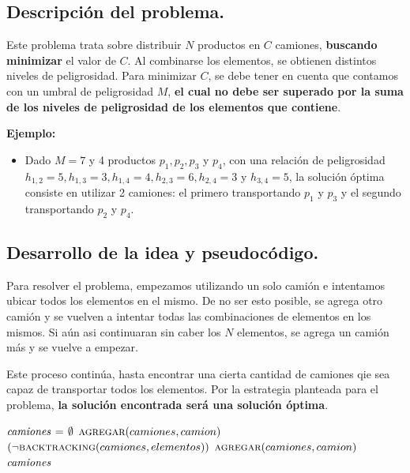 \subsection{Descripción del problema.}

\vspace*{0.3cm}

Este problema trata sobre distribuir $N$ productos en $C$ camiones, \textbf{buscando minimizar}
el valor de $C$. Al combinarse los elementos, se obtienen distintos niveles de peligrosidad.
Para minimizar $C$, se debe tener en cuenta que contamos con un umbral de peligrosidad
$M$, \textbf{el cual no debe ser superado por la suma de los niveles de peligrosidad de los
elementos que contiene}.

\vspace*{0.5cm}

\textbf{Ejemplo:}
\begin{itemize}
  \item Dado $M = 7$ y 4 productos $p_1, p_2, p_3$ y $p_4$, con una relación
  de peligrosidad $h_{1,2} = 5, h_{1,3} = 3, h_{1,4} = 4, h_{2,3} = 6, h_{2,4} =
  3$ y $h_{3,4} = 5$, la solución óptima consiste en utilizar 2 camiones: el primero
  transportando $p_1$ y $p_3$ y el segundo transportando $p_2$ y $p_4$.
\end{itemize}



\subsection{Desarrollo de la idea y pseudocódigo.}

Para resolver el problema, empezamos utilizando un solo camión e intentamos ubicar
todos los elementos en el mismo. De no ser esto posible, se agrega otro camión y se vuelven
a intentar todas las combinaciones de elementos en los mismos. Si aún asi continuaran sin
caber los $N$ elementos, se agrega un camión más y se vuelve a empezar.

Este proceso continúa, hasta encontrar una cierta cantidad de camiones qie sea capaz de
transportar todos los elementos. Por la estrategia planteada para el problema,
\textbf{la solución encontrada será una solución óptima}.

\vspace*{0.5cm}


\begin{codebox}
\li $\id{camiones} \gets \emptyset$
\li $\textnormal{\scshape agregar}(camiones, camion)$
\li \While $(\neg\textnormal{\scshape backtracking}(camiones, elementos))$
\li     \Do
            $\textnormal{\scshape agregar}(camiones, camion)$
        \End
\li \Return $\id{camiones}$
\end{codebox}


